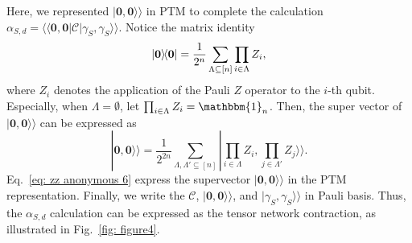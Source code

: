 \documentclass[showpacs,onecolumn,aps,prx,long bibliography,superscriptaddress,notitlepage]{revtex4-1}
\newcommand{\supket}[1]{|#1 \rangle\rangle}
\newcommand{\supbra}[1]{\langle\langle #1 |}
\begin{document}
Here, we represented $\supket{\bm 0,\bm 0}$ in PTM to complete the calculation $\alpha_{S,d} = \supbra{\bm 0,\bm 0} \mathcal{C}\supket{\gamma_S, \gamma_S}$.
Notice the matrix identity 
\begin{equation}
    \ketbra{\bm 0} = \frac{1}{2^n} \sum_{\Lambda\subseteq [n]} \prod_{i \in \Lambda} Z_i,
\end{equation}
where $Z_i$ denotes the application of the Pauli $Z$ operator to the $i$-th qubit.
Especially, when $\Lambda = \emptyset$, let $\prod_{i \in \Lambda} Z_i = \mathbbm{1}_n$. Then, the super vector of $\supket{\bm 0, \bm 0}$ can be expressed as
\begin{equation}
\label{eq: zz anonymous 6}
    \supket{\bm 0, \bm 0} = \frac{1}{2^{2n}} \sum_{\Lambda, \Lambda' \subseteq [n]}  \supket{\prod_{i \in \Lambda }  Z_i, \prod_{j \in \Lambda'} Z_j}.
\end{equation}
Eq.~\eqref{eq: zz anonymous 6} express the supervector $\supket{\bm 0, \bm 0}$ in the PTM representation. Finally, we write the $\mathcal{C}$, $\supket{\bm 0, \bm 0}$, and $\supket{\gamma_S, \gamma_S}$ in Pauli basis.
Thus, the $\alpha_{S,d}$ calculation can be expressed as the tensor network contraction, as illustrated in Fig.~\ref{fig: figure4}.
\end{document}
